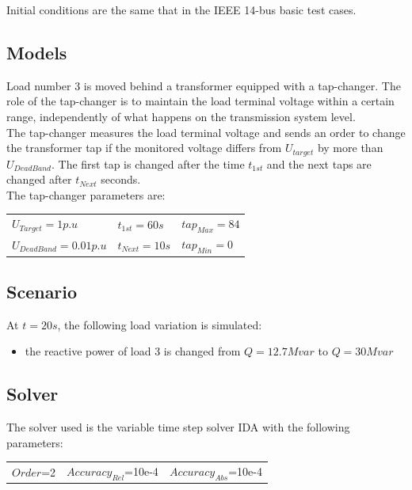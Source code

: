 \documentclass[a4paper, 12pt]{report}
\begin{document}
Initial conditions are the same that in the IEEE 14-bus basic test cases.

\subsection{Models}

Load number 3 is moved behind a transformer equipped with a tap-changer. The role of the tap-changer is to maintain the load terminal voltage within a certain range, independently of what happens on the transmission system level. \\

The tap-changer measures the load terminal voltage and sends an order to change the transformer tap if the monitored voltage differs from $U_{target}$ by more than $U_{DeadBand}$. The first tap is changed after the time $t_{1st}$ and the next taps are changed after $t_{Next}$ seconds.\\

The tap-changer parameters are:
\begin{center}
\begin{tabular}{l|l|l}
   $U_{Target}=1p.u$ & $t_{1st}=60s$ & $tap_{Max}=84$ \\
   $U_{DeadBand}=0.01p.u$  & $t_{Next}=10s$ & $tap_{Min}=0$ \\
\end{tabular}
\end{center}

\subsection{Scenario}
At $t=20s$, the following load variation is simulated:
\begin{itemize}
\item{the reactive power of load 3 is changed from $Q=12.7Mvar$ to $Q=30Mvar$}
\end{itemize}

\subsection{Solver}
The solver used is the variable time step solver IDA with the following parameters:
\begin{center}
\begin{tabular}{l|l|l}
   $Order$=2 & $Accuracy_{Rel}$=10e-4 & $Accuracy_{Abs}$=10e-4 \\
\end{tabular}
\end{center}
\end{document}
